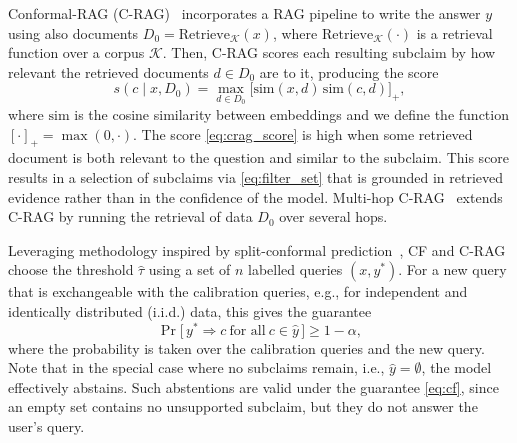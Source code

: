 Conformal-RAG (C-RAG)~\cite{feng2025response} incorporates a RAG pipeline to write the answer $y$ using also documents $D_0 = \mathrm{Retrieve}_{\mathcal{K}}(x)$, where $\mathrm{Retrieve}_{\mathcal{K}}(\cdot)$ is a retrieval function over a corpus $\mathcal{K}$. Then, C-RAG scores each resulting subclaim by how relevant the retrieved documents $d \in D_0$ are to it, producing the score
\begin{equation}\label{eq:crag_score}
  s(c \mid x, D_0) = \max_{d \in D_0} \bigl[\mathrm{sim}(x, d)\, \mathrm{sim}(c, d)\bigr]_+,
\end{equation}
where $\mathrm{sim}$ is the cosine similarity between embeddings and we define the function $[\cdot]_+ = \max(0, \cdot)$. The score \eqref{eq:crag_score} is high when some retrieved document is both relevant to the question and similar to the subclaim. This score results in a selection of subclaims via \eqref{eq:filter_set} that is grounded in retrieved evidence rather than in the confidence of the model. Multi-hop C-RAG~\cite{rehman2026conformal} extends C-RAG by running the retrieval of data $D_0$ over several hops.

Leveraging methodology inspired by split-conformal prediction~\cite{vovk2005algorithmic,angelopoulos2023conformal}, CF and C-RAG choose the threshold $\hat{\tau}$ using a set of $n$ labelled queries $(x, y^{*})$. For a new query that is exchangeable with the calibration queries, e.g., for independent and identically distributed (i.i.d.) data, this gives the guarantee
\begin{equation}
  \Pr\bigl[\, y^* \Rightarrow c \ \text{for all} \ c \in \hat{y} \,\bigr] \geq 1 - \alpha,
  \label{eq:cf}
\end{equation}
where the probability is taken over the calibration queries and the new query. Note that in the special case where no subclaims remain, i.e., $\hat{y} = \emptyset$, the model effectively abstains. Such abstentions are valid under the guarantee \eqref{eq:cf}, since an empty set contains no unsupported subclaim, but they do not answer the user's query.